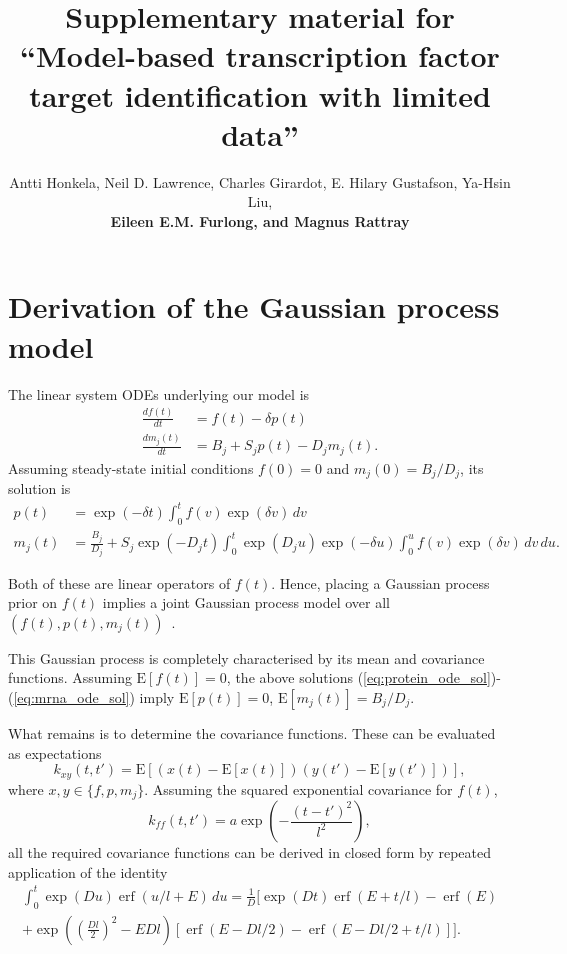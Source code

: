 \documentclass{article}
\title{Supplementary material for ``Model-based transcription factor
  target identification with limited data''}
\author{
Antti Honkela,
Neil D. Lawrence,
Charles Girardot, 
E. Hilary Gustafson,
Ya-Hsin Liu,\\
\bf Eileen E.M. Furlong, and
Magnus Rattray
}
\newcommand{\erf}{\operatorname{erf}}
\begin{document}
\maketitle


\section{Derivation of the Gaussian process model}

The linear system ODEs underlying our model is
\begin{align}
  \label{eq:translation_ode}
  \frac{df(t)}{dt} & = f(t) - \delta p(t) \\
  \label{eq:translation_ode}
  \frac{dm_j(t)}{dt} & = B_j + S_j p(t) - D_j m_j(t).
\end{align}
Assuming steady-state initial conditions $f(0) = 0$ and
$m_j(0) = B_j / D_j$, its solution is
\begin{align}
  \label{eq:protein_ode_sol}
  p(t) & = \exp(-\delta t) \int_0^t f(v) \exp(\delta v) \, dv \\
  \label{eq:mrna_ode_sol}
  m_j(t) & = \frac{B_j}{D_j} + S_j \exp(-D_j t) \int_0^t \exp(D_j
  u) \exp(-\delta u) \int_0^u f(v) \exp(\delta v) \, dv \, du.
\end{align}

Both of these are linear operators of $f(t)$.  Hence, placing a
Gaussian process prior on $f(t)$ implies a joint Gaussian process
model over all $(f(t), p(t), m_j(t))$~\cite{Rasmussen2006}.

This Gaussian process is completely characterised by its mean and
covariance functions.  Assuming $\mathrm{E}[f(t)] = 0$, the above
solutions (\ref{eq:protein_ode_sol})-(\ref{eq:mrna_ode_sol}) imply
$\mathrm{E}[p(t)] = 0$, $\mathrm{E}[m_j(t)] = B_j / D_j$.

What remains is to determine the covariance functions.  These can
be evaluated as expectations
\begin{equation}
  \label{eq:kernel_definition}
  k_{xy}(t,t') = \mathrm{E}[(x(t) - \mathrm{E}[x(t)])(y(t') - \mathrm{E}[y(t')])],
\end{equation}
where $x,y \in \{f, p, m_j\}$.  Assuming the squared exponential
covariance for $f(t)$,
\begin{equation}
  \label{eq:sqexp_kernel}
  k_{ff}(t, t') = a \exp\left( -\frac{(t-t')^2}{l^2} \right),
\end{equation}
all the required covariance functions can be derived in closed form
by repeated application of the identity
\begin{multline}
  \label{eq:gpsim_identity}
  \int_0^t \exp(D u) \erf(u/l + E)\,du =
  \frac{1}{D} \bigg[
  \exp(Dt) \erf(E + t/l) - \erf(E) \\
  + \exp\left(\left( \frac{Dl}{2}\right)^2 -E Dl \right)
  [ \erf(E - Dl/2) - \erf(E-Dl/2+t/l) ]
  \bigg].
\end{multline}
\end{document}
